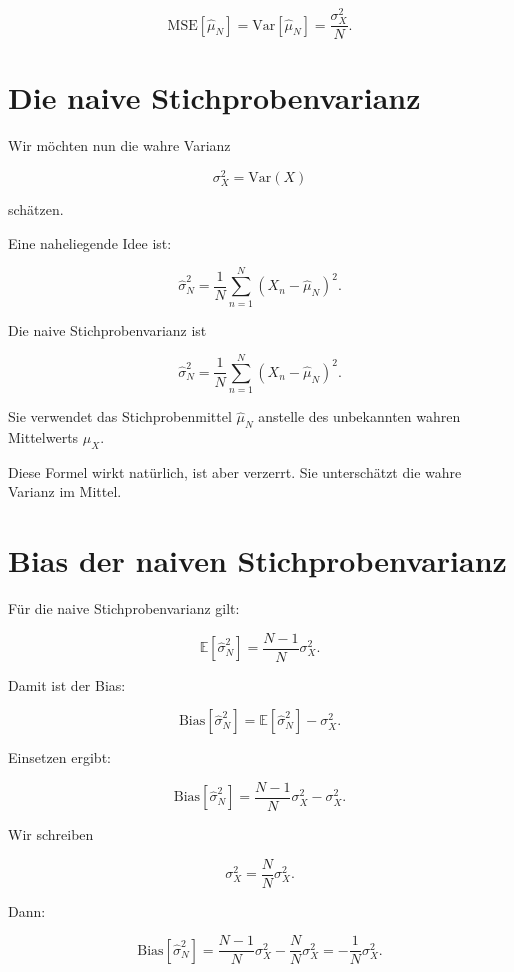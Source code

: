 \[
    \mathrm{MSE}[\hat{\mu}_N]
    =
    \mathrm{Var}[\hat{\mu}_N]
    =
    \frac{\sigma_X^2}{N}.
\]

\section{Die naive Stichprobenvarianz}

Wir möchten nun die wahre Varianz

\[
    \sigma_X^2
    =
    \mathrm{Var}(X)
\]

schätzen.

Eine naheliegende Idee ist:

\[
    \hat{\sigma}^2_N
    =
    \frac{1}{N}
    \sum_{n=1}^{N}
    (X_n-\hat{\mu}_N)^2.
\]

\begin{definitionbox}
Die naive Stichprobenvarianz ist

\[
    \hat{\sigma}^2_N
    =
    \frac{1}{N}
    \sum_{n=1}^{N}
    (X_n-\hat{\mu}_N)^2.
\]

Sie verwendet das Stichprobenmittel \(\hat{\mu}_N\) anstelle des unbekannten wahren Mittelwerts \(\mu_X\).
\end{definitionbox}

Diese Formel wirkt natürlich, ist aber verzerrt.
Sie unterschätzt die wahre Varianz im Mittel.

\section{Bias der naiven Stichprobenvarianz}

Für die naive Stichprobenvarianz gilt:

\[
    \mathbb{E}[\hat{\sigma}^2_N]
    =
    \frac{N-1}{N}
    \sigma_X^2.
\]

Damit ist der Bias:

\[
    \mathrm{Bias}[\hat{\sigma}^2_N]
    =
    \mathbb{E}[\hat{\sigma}^2_N]
    -
    \sigma_X^2.
\]

Einsetzen ergibt:

\[
    \mathrm{Bias}[\hat{\sigma}^2_N]
    =
    \frac{N-1}{N}
    \sigma_X^2
    -
    \sigma_X^2.
\]

Wir schreiben

\[
    \sigma_X^2
    =
    \frac{N}{N}
    \sigma_X^2.
\]

Dann:

\[
    \mathrm{Bias}[\hat{\sigma}^2_N]
    =
    \frac{N-1}{N}
    \sigma_X^2
    -
    \frac{N}{N}
    \sigma_X^2
    =
    -\frac{1}{N}
    \sigma_X^2.
\]

